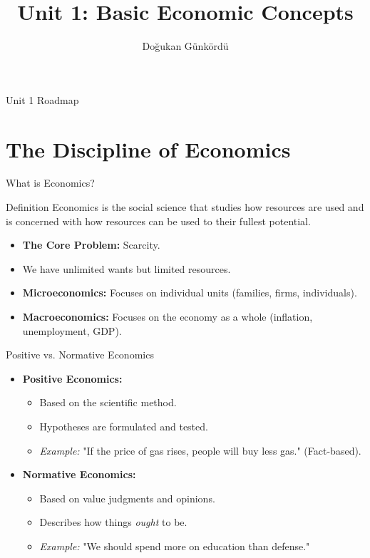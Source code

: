 \documentclass{beamer}
\title{Unit 1: Basic Economic Concepts}
\subtitle{}
\author{Doğukan Günkördü}
\date{}
\begin{document}
\begin{frame}
    \titlepage
\end{frame}

\begin{frame}{Unit 1 Roadmap}
    \tableofcontents
\end{frame}

\section{The Discipline of Economics}

\begin{frame}{What is Economics?}
    \begin{block}{Definition}
        Economics is the social science that studies how resources are used and is concerned with how resources can be used to their fullest potential.
    \end{block}
    
    \begin{itemize}
        \item \textbf{The Core Problem:} \alert{Scarcity}.
        \item We have unlimited wants but limited resources.
        \item \textbf{Microeconomics:} Focuses on individual units (families, firms, individuals).
        \item \textbf{Macroeconomics:} Focuses on the economy as a whole (inflation, unemployment, GDP).
    \end{itemize}
\end{frame}

\begin{frame}{Positive vs. Normative Economics}
    \begin{itemize}
        \item \textbf{Positive Economics:}
        \begin{itemize}
            \item Based on the scientific method.
            \item Hypotheses are formulated and tested.
            \item \textit{Example:} "If the price of gas rises, people will buy less gas." (Fact-based).
        \end{itemize}
        \vspace{0.5cm}
        \item \textbf{Normative Economics:}
        \begin{itemize}
            \item Based on value judgments and opinions.
            \item Describes how things \textit{ought} to be.
            \item \textit{Example:} "We should spend more on education than defense."
        \end{itemize}
    \end{itemize}
\end{frame}
\end{document}
